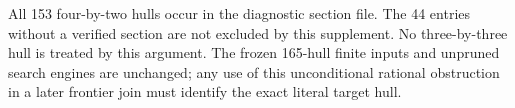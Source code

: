 \begin{remark*}
All 153 four-by-two hulls occur in the diagnostic section file.
The 44 entries without a verified section are not excluded by this
supplement.  No three-by-three hull is treated by this argument.
The frozen 165-hull finite inputs and unpruned search engines are
unchanged; any use of this unconditional rational obstruction in
a later frontier join must identify the exact literal target hull.
\end{remark*}
